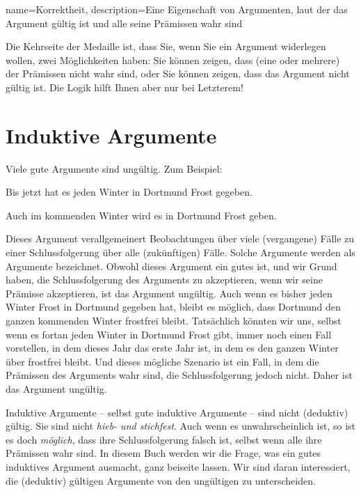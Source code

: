 {
name=Korrektheit,
description={Eine Eigenschaft von Argumenten, laut der das Argument gültig ist und alle seine Prämissen wahr sind}
}

Die Kehrseite der Medaille ist, dass Sie, wenn Sie ein Argument widerlegen wollen, zwei Möglichkeiten haben: Sie können zeigen, dass (eine oder mehrere) der Prämissen nicht wahr sind, oder Sie können zeigen, dass das Argument nicht gültig ist. Die Logik hilft Ihnen aber nur bei Letzterem!  

\section{Induktive Argumente}

Viele gute Argumente sind ungültig. Zum Beispiel:
	\begin{earg}
		\item[] Bis jetzt hat es jeden Winter in Dortmund Frost gegeben.
	\item[\therefore] Auch im kommenden Winter wird es in Dortmund Frost geben.
\end{earg}
Dieses Argument verallgemeinert Beobachtungen über viele (vergangene) Fälle zu einer Schlussfolgerung über alle (zukünftigen) Fälle. Solche Argumente werden als  Argumente bezeichnet. Obwohl dieses Argument ein gutes ist, und wir Grund haben, die Schlussfolgerung des Arguments zu akzeptieren, wenn wir seine Prämisse akzeptieren, ist das Argument ungültig. Auch wenn es bisher jeden Winter Frost in Dortmund gegeben hat, bleibt es möglich, dass Dortmund den ganzen kommenden Winter frostfrei bleibt. Tatsächlich könnten wir uns, selbst wenn es fortan jeden Winter in Dortmund Frost gibt, immer noch einen Fall vorstellen, in dem dieses Jahr das erste Jahr ist, in dem es den ganzen Winter über frostfrei bleibt. Und dieses mögliche Szenario ist ein Fall, in dem die Prämissen des Arguments wahr sind, die Schlussfolgerung jedoch nicht. Daher ist das Argument ungültig.

Induktive Argumente -- selbst gute induktive Argumente -- sind nicht (deduktiv) gültig. Sie sind nicht \emph{hieb- und stichfest}. Auch wenn es unwahrscheinlich ist, so ist es doch \emph{möglich}, dass ihre Schlussfolgerung falsch ist, selbst wenn alle ihre Prämissen wahr sind. In diesem Buch werden wir die Frage, was ein gutes induktives Argument ausmacht, ganz beiseite lassen. Wir sind daran interessiert, die (deduktiv) gültigen Argumente von den ungültigen zu unterscheiden.  

